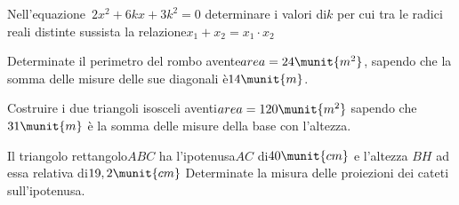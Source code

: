 \begin{esercizio}
 \label{ese:3.80}
Nell'equazione~\(2 x^{2} + 6 k x + 3 k^{2} = 0\) 
determinare i valori di\(k\) per cui tra le radici reali distinte sussista 
la relazione\(x_{1} + x_{2} = x_{1} \cdot x_{2}\)
\end{esercizio}

\begin{esercizio}
 \label{ese:3.81}
Determinate il perimetro del rombo avente\(area = 24\munit{m^{2}}\), 
sapendo che la somma delle misure delle sue diagonali è\(14\munit{m}\).
\end{esercizio}

\begin{esercizio}
\label{ese:3.82}
Costruire i due triangoli isosceli aventi\(area = 120\munit{m^{2}}\) sapendo 
che \(31\munit{m}\) è la somma delle misure della base con l'altezza.
\end{esercizio}

\begin{esercizio}
 \label{ese:3.83}
Il triangolo rettangolo\(ABC\) ha l'ipotenusa\(AC\) di\(40\munit{cm}\) e 
l'altezza 
\(BH\) ad essa relativa di\(19,2\munit{cm}~\)Determinate la misura delle 
proiezioni 
dei cateti sull'ipotenusa.
\end{esercizio}

\subsection*{}

